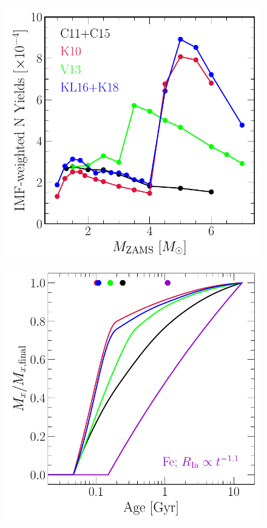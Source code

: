 \documentclass[ms.tex]{subfiles}
\begin{document}
\begin{figure}
\centering
\includegraphics[scale = 0.46]{agb_yield_models_imfweighted.pdf}
\includegraphics[scale = 0.45]{ssp_production_modelcomp.pdf}

\end{figure}
\end{document}
